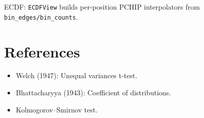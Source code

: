 \documentclass{article}
\begin{document}
ECDF: \texttt{ECDFView} builds per-position PCHIP interpolators from \texttt{bin\_edges/bin\_counts}.

\section{References}

\begin{itemize}
    \item Welch (1947): Unequal variances t-test.
    \item Bhattacharyya (1943): Coefficient of distributions.
    \item Kolmogorov--Smirnov test.
\end{itemize}
\end{document}

